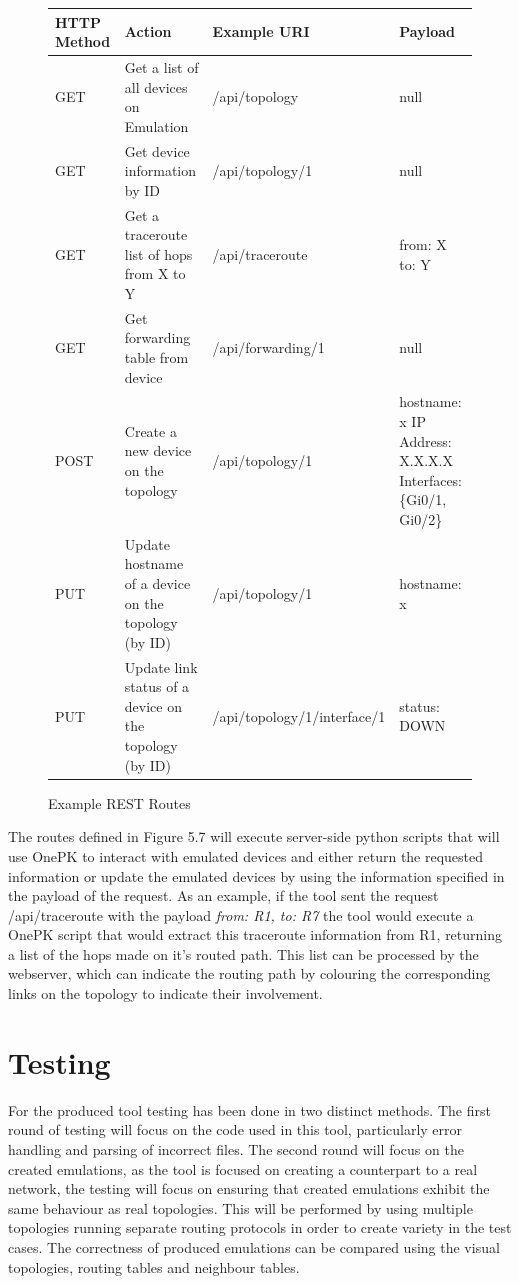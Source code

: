 \documentclass[11pt]{report}
\begin{document}
\begin{figure}[h!]
	\caption{Example REST Routes}
	\centering
	\begin{tabular}{|p{1.5cm}|p{4cm}|p{5cm}|p{3.5cm}|}
		\hline \textbf{HTTP Method} & \textbf{Action} & \textbf{Example URI} & \textbf{Payload} \\ 
		\hline GET & Get a list of all devices on Emulation & /api/topology & null \\ 
		\hline GET & Get device information by ID & /api/topology/1 & null \\ 
		\hline GET & Get a traceroute list of hops from X to Y & /api/traceroute & from: X 
		\newline
		to: Y \\ 
		\hline GET & Get forwarding table from device & /api/forwarding/1 & null  \\ 
		\hline POST & Create a new device on the topology & /api/topology/1 & hostname: x 
		\newline
		IP Address: X.X.X.X 
		\newline
		Interfaces: \{Gi0/1, Gi0/2\} \\ 
		\hline PUT & Update hostname of a  device on the topology (by ID) & /api/topology/1 & hostname: x \\ 
		\hline PUT & Update link status of a  device on the topology (by ID) & /api/topology/1/interface/1 & status: DOWN  \\ 
		\hline
	\end{tabular}
\end{figure}
 
The routes defined in Figure 5.7 will execute server-side python scripts that will use OnePK to interact with emulated devices and either return the requested information or update the emulated devices by using the information specified in the payload of the request. As an example, if the tool sent the request /api/traceroute with the payload \textit{from: R1, to: R7} the tool would execute a OnePK script that would extract this traceroute information from R1, returning a list of the hops made on it's routed path. This list can be processed by the webserver, which can indicate the routing path by colouring the corresponding links on the topology to indicate their involvement.

\chapter{Testing}

For the produced tool testing has been done in two distinct methods. The first round of testing will focus on the code used in this tool, particularly error handling and parsing of incorrect files. The second round will focus on the created emulations, as the tool is focused on creating a counterpart to a real network, the testing will focus on ensuring that created emulations exhibit the same behaviour as real topologies. This will be performed by using multiple topologies running separate routing protocols in order to create variety in the test cases. The correctness of produced emulations can be compared using the visual topologies, routing tables and neighbour tables.
\end{document}

